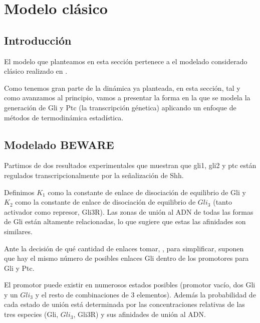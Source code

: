 
\chapter{Modelo clásico}

\label{ch:modelo_clasico}

\section{Introducción}
El modelo que planteamos en esta sección pertenece a el modelado considerado clásico realizado en \cite{schaffer}.

Como tenemos gran parte de la dinámica ya planteada, en esta sección, tal y como avanzamos al principio, vamos a presentar la forma en la que se modela la generación de Gli y Ptc (la transcripción génetica) aplicando un enfoque de métodos de termodinámica estadística.

\section{Modelado BEWARE}
 
 
 
 Partimos de dos resultados experimentales que muestran que gli1, gli2 y ptc están regulados transcripcionalmente por la señalización de Shh.
 
  Definimos $K_1$ como la constante de enlace de disociación de equilibrio de Gli y $K_2$ como la constante de enlace de disociación de equilibrio de $Gli_3$ (tanto activador como represor, Gli3R). Las zonas de unión al ADN de todas las formas de Gli están altamente relacionadas, lo que sugiere que estas las afinidades son similares.
  
  Ante la decisión de qué cantidad de enlaces tomar, \cite{schaffer}, para simplificar, suponen que hay el mismo número de posibles enlaces Gli dentro de los
  promotores para Gli y Ptc.
  
  
  El promotor puede existir en numerosos
  estados posibles (promotor vacío, dos Gli  y un $Gli_3$ y el resto de combinaciones de 3 elementos). Además la probabilidad de cada estado de unión está determinada por las concentraciones relativas de las tres especies (Gli, $Gli_3$, Gli3R) y sus afinidades de unión al ADN. 
  
